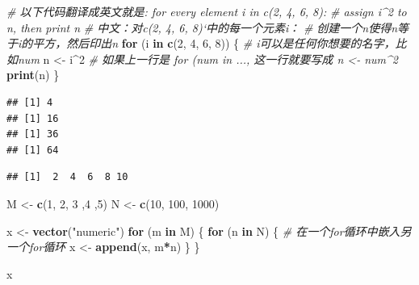 \documentclass[]{book}
\newenvironment{Shaded}{\begin{snugshade}}{\end{snugshade}}
\newcommand{\CommentTok}[1]{\textcolor[rgb]{0.56,0.35,0.01}{\textit{#1}}}
\newcommand{\ControlFlowTok}[1]{\textcolor[rgb]{0.13,0.29,0.53}{\textbf{#1}}}
\newcommand{\DataTypeTok}[1]{\textcolor[rgb]{0.13,0.29,0.53}{#1}}
\newcommand{\DecValTok}[1]{\textcolor[rgb]{0.00,0.00,0.81}{#1}}
\newcommand{\KeywordTok}[1]{\textcolor[rgb]{0.13,0.29,0.53}{\textbf{#1}}}
\newcommand{\NormalTok}[1]{#1}
\newcommand{\OperatorTok}[1]{\textcolor[rgb]{0.81,0.36,0.00}{\textbf{#1}}}
\newcommand{\StringTok}[1]{\textcolor[rgb]{0.31,0.60,0.02}{#1}}
\begin{document}
\begin{Shaded}
\begin{Highlighting}[]
\CommentTok{# 以下代码翻译成英文就是: for every element i in c(2, 4, 6, 8): }
\CommentTok{# assign i^2 to n, then print n}
\CommentTok{# 中文：对c(2, 4, 6, 8)`中的每一个元素i：}
\CommentTok{# 创建一个n使得n等于i的平方，然后印出n}
\ControlFlowTok{for}\NormalTok{ (i }\ControlFlowTok{in} \KeywordTok{c}\NormalTok{(}\DecValTok{2}\NormalTok{, }\DecValTok{4}\NormalTok{, }\DecValTok{6}\NormalTok{, }\DecValTok{8}\NormalTok{)) \{ }\CommentTok{# i可以是任何你想要的名字，比如num}
\NormalTok{  n <-}\StringTok{ }\NormalTok{i}\OperatorTok{^}\DecValTok{2} \CommentTok{# 如果上一行是 for (num in ..., 这一行就要写成 n <- num^2}
  \KeywordTok{print}\NormalTok{(n)}
\NormalTok{\}}
\end{Highlighting}
\end{Shaded}

\begin{verbatim}
## [1] 4
## [1] 16
## [1] 36
## [1] 64
\end{verbatim}

\begin{Shaded}
\end{Shaded}

\begin{verbatim}
## [1]  2  4  6  8 10
\end{verbatim}

\begin{Shaded}
\begin{Highlighting}[]
\NormalTok{M <-}\StringTok{ }\KeywordTok{c}\NormalTok{(}\DecValTok{1}\NormalTok{, }\DecValTok{2}\NormalTok{, }\DecValTok{3}\NormalTok{ ,}\DecValTok{4}\NormalTok{ ,}\DecValTok{5}\NormalTok{)}
\NormalTok{N <-}\StringTok{ }\KeywordTok{c}\NormalTok{(}\DecValTok{10}\NormalTok{, }\DecValTok{100}\NormalTok{, }\DecValTok{1000}\NormalTok{)}

\NormalTok{x <-}\StringTok{ }\KeywordTok{vector}\NormalTok{(}\StringTok{"numeric"}\NormalTok{)}
\ControlFlowTok{for}\NormalTok{ (m }\ControlFlowTok{in}\NormalTok{ M) \{}
  \ControlFlowTok{for}\NormalTok{ (n }\ControlFlowTok{in}\NormalTok{ N) \{ }\CommentTok{# 在一个for循环中嵌入另一个for循环}
\NormalTok{    x <-}\StringTok{ }\KeywordTok{append}\NormalTok{(x, m}\OperatorTok{*}\NormalTok{n)}
\NormalTok{  \}}
\NormalTok{\}}

\NormalTok{x}
\end{Highlighting}
\end{Shaded}
\end{document}
